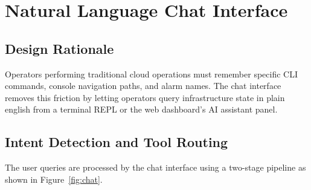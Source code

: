 \documentclass{ieeeaccess}
\begin{document}
\section{Natural Language Chat Interface}
\label{sec:chat}

\subsection{Design Rationale}
Operators performing traditional cloud operations must remember specific CLI commands, console navigation paths, and alarm names. The chat interface removes this friction by letting operators query infrastructure state in plain english from a terminal REPL or the web dashboard’s AI assistant panel.

\subsection{Intent Detection and Tool Routing}
The user queries are processed by the chat interface using a two-stage pipeline as shown in Figure~\ref{fig:chat}.
\end{document}

